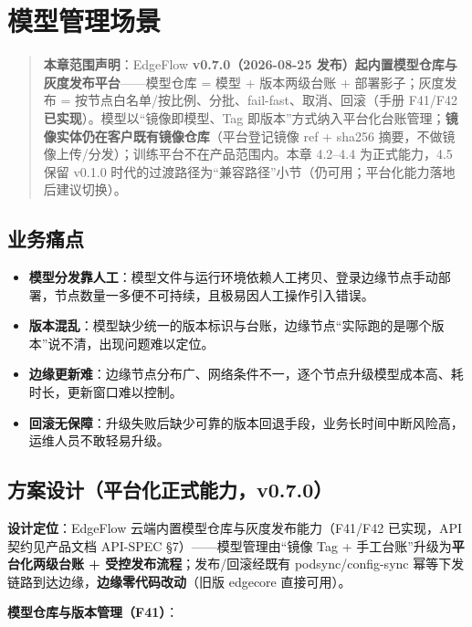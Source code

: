 \chapter{模型管理场景}

\begin{quote}
\textbf{本章范围声明}：EdgeFlow \textbf{v0.7.0（2026-08-25 发布）起内置模型仓库与灰度发布平台}——模型仓库 = 模型 + 版本两级台账 + 部署影子；灰度发布 = 按节点白名单/按比例、分批、fail-fast、取消、回滚（手册 F41/F42 \textbf{已实现}）。模型以“镜像即模型、Tag 即版本”方式纳入平台化台账管理；\textbf{镜像实体仍在客户既有镜像仓库}（平台登记镜像 ref + sha256 摘要，不做镜像上传/分发）；训练平台不在产品范围内。本章 4.2--4.4 为正式能力，4.5 保留 v0.1.0 时代的过渡路径为“兼容路径”小节（仍可用；平台化能力落地后建议切换）。
\end{quote}

\section{业务痛点}

\begin{itemize}
  \item \textbf{模型分发靠人工}：模型文件与运行环境依赖人工拷贝、登录边缘节点手动部署，节点数量一多便不可持续，且极易因人工操作引入错误。
  \item \textbf{版本混乱}：模型缺少统一的版本标识与台账，边缘节点“实际跑的是哪个版本”说不清，出现问题难以定位。
  \item \textbf{边缘更新难}：边缘节点分布广、网络条件不一，逐个节点升级模型成本高、耗时长，更新窗口难以控制。
  \item \textbf{回滚无保障}：升级失败后缺少可靠的版本回退手段，业务长时间中断风险高，运维人员不敢轻易升级。
\end{itemize}

\section{方案设计（平台化正式能力，v0.7.0）}

\textbf{设计定位}：EdgeFlow 云端内置模型仓库与灰度发布能力（F41/F42 已实现，API 契约见产品文档 API-SPEC §7）——模型管理由“镜像 Tag + 手工台账”升级为\textbf{平台化两级台账 + 受控发布流程}；发布/回滚经既有 podsync/config-sync 幂等下发链路到达边缘，\textbf{边缘零代码改动}（旧版 edgecore 直接可用）。

\textbf{模型仓库与版本管理（F41）}：

